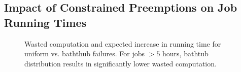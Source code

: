 


\vspace*{\subsecspace}
\subsection{Impact of Constrained Preemptions on Job Running Times}

\begin{figure}[t]
  \vspace*{\myfigspace}    
    \vspace*{-0.4cm}
    \caption{Wasted computation and expected increase in running time for uniform vs. baththub failures. For jobs $>5$ hours, bathtub distribution results in significantly lower wasted computation.}
\vspace*{\myfigspace}    
  \label{fig:vs-uniform-both}
  
\end{figure}


